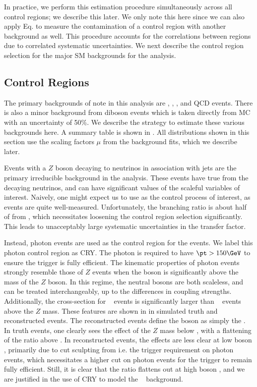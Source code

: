 In practice, we perform this estimation procedure simultaneously across all control regions; we describe this later.
We only note this here since we can also apply Eq. to measure the contamination of a control region with another background as well.
This procedure accounts for the correlations between regions due to correlated systematic uncertainties.
We next describe the control region selection for the major SM backgrounds for the analysis.

\subsection{Control Regions}

The primary backgrounds of note in this analysis are \zjets, \wjets, \ttbar, and QCD events.
There is also a minor background from diboson events which is taken directly from MC with an uncertainty of 50\%.
We describe the strategy to estimate these various backgrounds here.
A summary table is shown in .
All distributions shown in this section use the scaling factors $\mu$ from the background fits, which we describe later.


Events with a $Z$ boson decaying to neutrinos in association with jets are the primary irreducible background in the analysis.
These events have true \met from the decaying neutrinos, and can have significant values of the scaleful variables of interest.
Naively, one might expect us to use \Zll as the control process of interest, as \Zll events are quite well-measured.
Unfortunately, the \Zll branching ratio is about half of from \Zvv, which necessitates loosening the control region selection significantly.
This leads to unacceptably large systematic uncertainties in the transfer factor.

Instead, photon events are used as the control region for the \Zvv events.
We label this photon control region as CRY.
The photon is required to have $\pt > 150 \GeV$ to ensure the trigger is fully efficient.
The kinematic properties of photon events strongly resemble those of $Z$ events when the boson \pt is significantly above the mass of the $Z$ boson.
In this regime, the neutral bosons are both scaleless, and can be treated interchangeably, up to the differences in coupling strengths.
Additionally, the cross-section for \gammajets~ events is significantly larger than \zjets~ events above the $Z$ mass.
These features are shown in  in simulated \Zvv truth and reconstructed events.
The reconstructed \Zvv events define the boson \pt as simply the \met.
In truth events, one clearly sees the effect of the $Z$ mass below  \GeV, with a flattening of the ratio above  \GeV.
In reconstructed events, the effects are less clear at low boson \pt, primarily due to cut sculpting from i.e. the trigger requirement on photon events, which necessitates a higher \pt cut on photon events for the trigger to remain fully efficient.
Still, it is clear that the ratio flattens out at high boson \pt, and we are justified in the use of CRY to model the \zjets~ background.

